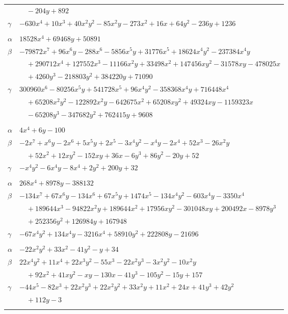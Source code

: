 \documentclass[11pt]{article}
\begin{document}
\begin{longtable}{@{}ll@{}}
 & $\quad -204y+892$\\
$\gamma$ & $-630x^{4}+10x^{3}+40x^{2}y^{2}-85x^{2}y-273x^{2}+16x+64y^{2}-236y+1236$\\
\addlinespace[3pt]
\multicolumn{2}{@{}l}{$\{i,j\}=\{6,11\}$, $k_{ij}=2\cdot 7^{2}$}\\
$\alpha$ & $18528x^{4}+69468y+50891$\\
$\beta$ & $-79872x^{7}+96x^{6}y-288x^{6}-5856x^{5}y+31776x^{5}+18624x^{4}y^{2}-237384x^{4}y$\\
 & $\quad +290712x^{4}+127552x^{3}-11166x^{2}y+33498x^{2}+147456xy^{2}-31578xy-478025x$\\
 & $\quad +4260y^{3}-218803y^{2}+384220y+71090$\\
$\gamma$ & $300960x^{6}-80256x^{5}y+541728x^{5}+96x^{4}y^{2}-358368x^{4}y+716448x^{4}$\\
 & $\quad +65208x^{2}y^{2}-122892x^{2}y-642675x^{2}+65208xy^{2}+49324xy-1159323x$\\
 & $\quad -65208y^{3}-347682y^{2}+762415y+9608$\\
\addlinespace[3pt]
\multicolumn{2}{@{}l}{$\{i,j\}=\{8,11\}$, $k_{ij}=2^{3}\cdot 3\cdot 11$}\\
$\alpha$ & $4x^{4}+6y-100$\\
$\beta$ & $-2x^{7}+x^{6}y-2x^{6}+5x^{5}y+2x^{5}-3x^{4}y^{2}-x^{4}y-2x^{4}+52x^{3}-26x^{2}y$\\
 & $\quad +52x^{2}+12xy^{2}-152xy+36x-6y^{3}+86y^{2}-20y+52$\\
$\gamma$ & $-x^{4}y^{2}-6x^{4}y-8x^{4}+2y^{2}+200y+32$\\
\addlinespace[3pt]
\multicolumn{2}{@{}l}{$\{i,j\}=\{8,12\}$, $k_{ij}=2^{3}\cdot 3^{5}\cdot 7^{2}\cdot 13$}\\
$\alpha$ & $268x^{4}+8978y-388132$\\
$\beta$ & $-134x^{7}+67x^{6}y-134x^{6}+67x^{5}y+1474x^{5}-134x^{4}y^{2}-603x^{4}y-3350x^{4}$\\
 & $\quad +189644x^{3}-94822x^{2}y+189644x^{2}+17956xy^{2}-301048xy+200492x-8978y^{3}$\\
 & $\quad +252356y^{2}+126984y+167948$\\
$\gamma$ & $-67x^{4}y^{2}+134x^{4}y-3216x^{4}+58910y^{2}+222808y-21696$\\
\addlinespace[3pt]
\multicolumn{2}{@{}l}{$\{i,j\}=\{10,13\}$, $k_{ij}=2^{3}\cdot 3$}\\
$\alpha$ & $-22x^{2}y^{2}+33x^{2}-41y^{2}-y+34$\\
$\beta$ & $22x^{4}y^{2}+11x^{4}+22x^{3}y^{2}-55x^{3}-22x^{2}y^{3}-3x^{2}y^{2}-10x^{2}y$\\
 & $\quad +92x^{2}+41xy^{2}-xy-130x-41y^{3}-105y^{2}-15y+157$\\
$\gamma$ & $-44x^{5}-82x^{3}+22x^{2}y^{3}+22x^{2}y^{2}+33x^{2}y+11x^{2}+24x+41y^{3}+42y^{2}$\\
 & $\quad +112y-3$\\
\addlinespace[3pt]
\end{longtable}
\endgroup
\end{document}
